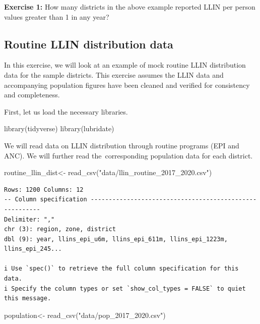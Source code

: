 \documentclass[
  letterpaper,
  DIV=11,
  numbers=noendperiod]{scrreprt}
\newenvironment{Shaded}{\begin{snugshade}}{\end{snugshade}}
\newcommand{\FunctionTok}[1]{\textcolor[rgb]{0.28,0.35,0.67}{#1}}
\newcommand{\NormalTok}[1]{\textcolor[rgb]{0.00,0.23,0.31}{#1}}
\newcommand{\OtherTok}[1]{\textcolor[rgb]{0.00,0.23,0.31}{#1}}
\newcommand{\StringTok}[1]{\textcolor[rgb]{0.13,0.47,0.30}{#1}}
\begin{document}
\textbf{Exercise 1:} How many districts in the above example reported
LLIN per person values greater than 1 in any year?

\hypertarget{routine-llin-distribution-data}{%
\subsection{\texorpdfstring{\textbf{Routine LLIN distribution
data}}{Routine LLIN distribution data}}\label{routine-llin-distribution-data}}

In this exercise, we will look at an example of mock routine LLIN
distribution data for the sample districts. This exercise assumes the
LLIN data and accompanying population figures have been cleaned and
verified for consistency and completeness.

First, let us load the necessary libraries.~~~

\begin{Shaded}
\begin{Highlighting}[]
\FunctionTok{library}\NormalTok{(tidyverse)}
\FunctionTok{library}\NormalTok{(lubridate)}
\end{Highlighting}
\end{Shaded}

We will read data on LLIN distribution through routine programs (EPI and
ANC). We will further read the~corresponding population data for each
district.

\begin{Shaded}
\begin{Highlighting}[]
\NormalTok{routine\_llin\_dist}\OtherTok{\textless{}{-}} \FunctionTok{read\_csv}\NormalTok{(}\StringTok{"data/llin\_routine\_2017\_2020.csv"}\NormalTok{) }
\end{Highlighting}
\end{Shaded}

\begin{verbatim}
Rows: 1200 Columns: 12
-- Column specification --------------------------------------------------------
Delimiter: ","
chr (3): region, zone, district
dbl (9): year, llins_epi_u6m, llins_epi_611m, llins_epi_1223m, llins_epi_245...

i Use `spec()` to retrieve the full column specification for this data.
i Specify the column types or set `show_col_types = FALSE` to quiet this message.
\end{verbatim}

\begin{Shaded}
\begin{Highlighting}[]
\NormalTok{population}\OtherTok{\textless{}{-}} \FunctionTok{read\_csv}\NormalTok{(}\StringTok{"data/pop\_2017\_2020.csv"}\NormalTok{)}
\end{Highlighting}
\end{Shaded}
\end{document}

